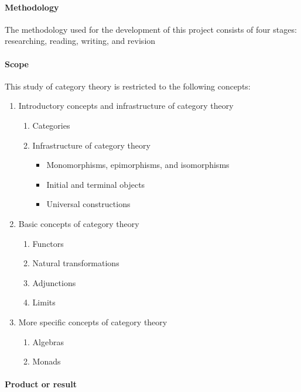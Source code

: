 \paragraph{Methodology}

The methodology used for the development of this project consists of
four stages: researching, reading, writing, and revision

\paragraph{Scope}

This study of category theory is restricted to the following concepts:

\begin{enumerate}
\item Introductory concepts and infrastructure of category theory
  \begin{enumerate}
  \item Categories
  \item Infrastructure of category theory
    \begin{itemize}
    \item Monomorphisms, epimorphisms, and isomorphisms
    \item Initial and terminal objects
    \item Universal constructions
    \end{itemize}
  \end{enumerate}
\item Basic concepts of category theory
  \begin{enumerate}
  \item Functors
  \item Natural transformations
  \item Adjunctions
  \item Limits
  \end{enumerate}
\item More specific concepts of category theory
  \begin{enumerate}
  \item Algebras
  \item Monads
  \end{enumerate}
\end{enumerate}

\paragraph{Product or result}

